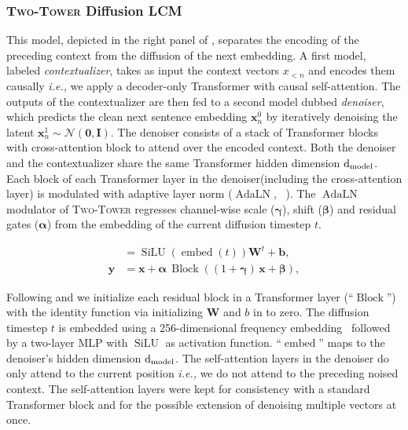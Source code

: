 \documentclass[twoside,11pt]{fairmeta}
\newcommand{\lcm}{\textsc{LCM}\xspace}
\newcommand{\twotower}{\textsc{Two-Tower}\xspace}
\newcommand{\diffx}[2]{\rvx^{#1}_{#2}}
\DeclareMathOperator{\adaln}{AdaLN}
\DeclareMathOperator{\tembed}{embed}
\DeclareMathOperator{\silu}{SiLU}
\DeclareMathOperator{\tfblock}{Block}
\newcommand{\modeldim}{\rd_\text{model}}
\newcommand{\ctxenc}{contextualizer\xspace}
\newcommand{\denoiser}{denoiser\xspace}
\newcommand{\ie}{\textit{i.e.,}\xspace}
\def\rd{{\textnormal{d}}}
\def\rvalpha{{\bm{\alpha}}}
\def\rvbeta{{\bm{\beta}}}
\def\rvgamma{{\bm{\gamma}}}
\def\rvb{{\mathbf{b}}}
\def\rvx{{\mathbf{x}}}
\def\rvy{{\mathbf{y}}}
\def\rvzero{{\mathbf{0}}}
\def\rmI{{\mathbf{I}}}
\def\rmW{{\mathbf{W}}}
\begin{document}
\subsubsection{\twotower Diffusion \lcm}
\label{sec:arch:twotower}
This model, depicted in the right panel of , separates the encoding of the preceding context from the diffusion of the next embedding.
A first model, labeled \emph{\ctxenc}, takes as input the context vectors $x_{<n}$ and encodes them causally \ie we apply a decoder-only Transformer with causal self-attention.
The outputs of the \ctxenc are then fed to a second model dubbed \emph{\denoiser}, which predicts the clean next sentence embedding $\diffx{0}{n}$ by iteratively denoising the latent $\diffx{1}{n} \sim \mathcal N(\rvzero, \rmI)$. 
The \denoiser consists of a stack of Transformer blocks with cross-attention block to attend over the encoded context.
Both the \denoiser and the \ctxenc share the same Transformer hidden dimension $\modeldim$.
Each block of each Transformer layer in the \denoiser (including the cross-attention layer) is modulated with adaptive layer norm ($\adaln$, ~\citet{perez2018film, peebles2023scalable}). The $\adaln$ modulator of \twotower regresses channel-wise scale ($\rvgamma$), shift ($\rvbeta$) and residual gates ($\rvalpha$) from the embedding of the current diffusion timestep $t$.

\begin{align}
    [\rvbeta, \rvgamma, \rvalpha] & = \silu(\tembed(t)) \rmW^t + \rvb, 
    \label{eq:twotower:adaln:regress}\\
    \rvy & = \rvx + \rvalpha \,\tfblock((1+\rvgamma)\,\rvx + \rvbeta),\label{eq:twotower:adalan:modulate}
\end{align}

Following \citet{peebles2023scalable} and \citet{goyal2017accurate} we initialize each residual block in a Transformer layer (``$\tfblock$'') with the identity function via initializing $\rmW$ and $b$ in  to zero.
The diffusion timestep $t$ is embedded using a 256-dimensional frequency embedding~\citep{dhariwal2021diffusion,peebles2023scalable} followed by a two-layer MLP with $\silu$ as activation function. ``$\tembed$'' maps to the \denoiser's hidden dimension $\modeldim$. The self-attention layers in the \denoiser do only attend to the current position \ie we do not attend to the preceding noised context. The self-attention layers were kept for consistency with a standard Transformer block and for the possible extension of denoising multiple vectors at once.
\end{document}
